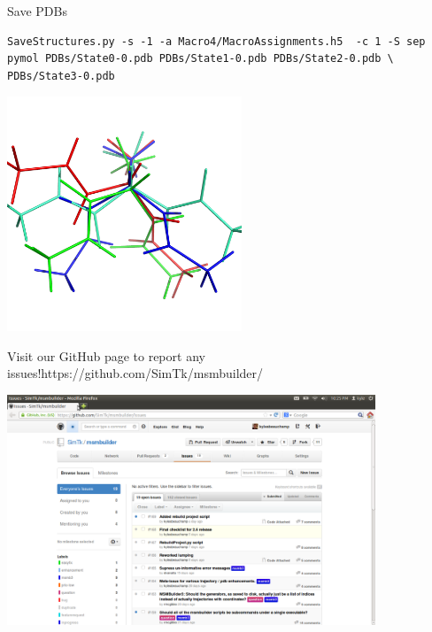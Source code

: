 \documentclass[10pt]{beamer}
\begin{document}
\begin{frame}[fragile]{Save PDBs}
 
\begin{verbatim}
SaveStructures.py -s -1 -a Macro4/MacroAssignments.h5  -c 1 -S sep
pymol PDBs/State0-0.pdb PDBs/State1-0.pdb PDBs/State2-0.pdb \
PDBs/State3-0.pdb
\end{verbatim}

\includegraphics[width=7.0cm]{Figures/ala.png}
 
\end{frame}

\begin{frame}{Visit our GitHub page to report any issues!}{https://github.com/SimTk/msmbuilder/}
 
 
 \includegraphics[width=11.0cm]{Figures/GitHub.png}
 
\end{frame}
\end{document}
